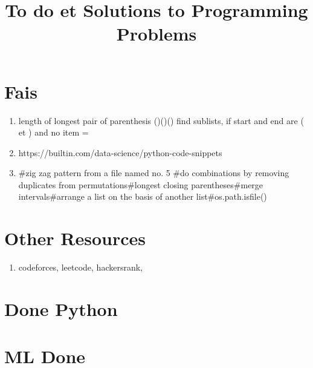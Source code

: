 \documentclass{article}
\title {To do et Solutions to Programming Problems}
\begin{document}
\maketitle

\section {Fais}
\begin{enumerate}

\item length of longest pair of  parenthesis ()()()
find sublists, if start and end are ( et ) and no item =
\item https://builtin.com/data-science/python-code-snippets
\item #zig zag pattern from a file named no. 5 #do combinations by removing duplicates from permutations#longest closing parentheses#merge intervals#arrange a list on the basis of another list#os.path.isfile()

\end{enumerate}

\section{Other Resources}
\begin{enumerate}
\item codeforces, leetcode, hackersrank,
\end{enumerate}

\section{Done Python}

\section {ML Done}
\end{document}

